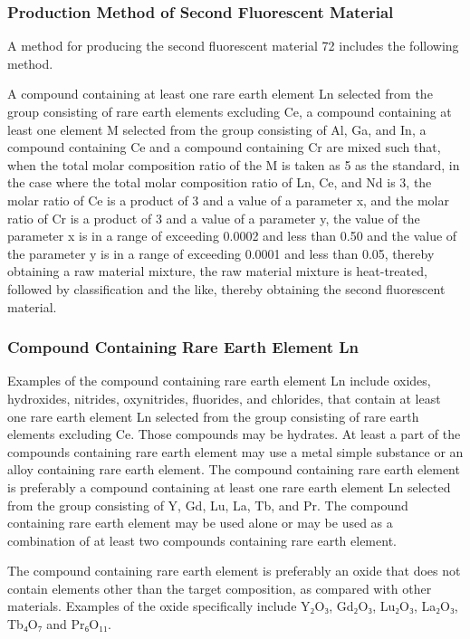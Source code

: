 \documentclass[11pt,a4paper]{article}
\begin{document}
\subsubsection{Production Method of Second Fluorescent Material}

A method for producing the second fluorescent material 72 includes the following method.

A compound containing at least one rare earth element Ln selected from the group consisting of rare earth elements excluding Ce, a compound containing at least one element M selected from the group consisting of Al, Ga, and In, a compound containing Ce and a compound containing Cr are mixed such that, when the total molar composition ratio of the M is taken as 5 as the standard, in the case where the total molar composition ratio of Ln, Ce, and Nd is 3, the molar ratio of Ce is a product of 3 and a value of a parameter x, and the molar ratio of Cr is a product of 3 and a value of a parameter y, the value of the parameter x is in a range of exceeding 0.0002 and less than 0.50 and the value of the parameter y is in a range of exceeding 0.0001 and less than 0.05, thereby obtaining a raw material mixture, the raw material mixture is heat-treated, followed by classification and the like, thereby obtaining the second fluorescent material.

\subsubsection{Compound Containing Rare Earth Element Ln}

Examples of the compound containing rare earth element Ln include oxides, hydroxides, nitrides, oxynitrides, fluorides, and chlorides, that contain at least one rare earth element Ln selected from the group consisting of rare earth elements excluding Ce. Those compounds may be hydrates. At least a part of the compounds containing rare earth element may use a metal simple substance or an alloy containing rare earth element. The compound containing rare earth element is preferably a compound containing at least one rare earth element Ln selected from the group consisting of Y, Gd, Lu, La, Tb, and Pr. The compound containing rare earth element may be used alone or may be used as a combination of at least two compounds containing rare earth element.

The compound containing rare earth element is preferably an oxide that does not contain elements other than the target composition, as compared with other materials. Examples of the oxide specifically include Y₂O₃, Gd₂O₃, Lu₂O₃, La₂O₃, Tb₄O₇ and Pr₆O₁₁.
\end{document}
